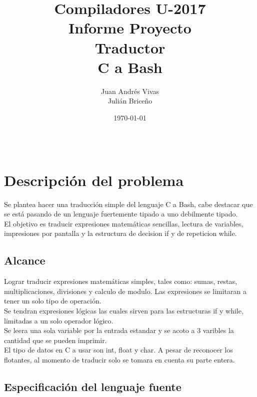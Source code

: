 \documentclass[aspectratio=169]{article}
\title{Compiladores U-2017 \\ Informe Proyecto \\ Traductor \\ C a Bash} %
\author{Juan Andr\'es Vivas\\
		Juli\'an Brice\~no} %
\date{\today} %
\begin{document}
\maketitle %

\begin{center}
\begin{tabular}{l r}

\end{tabular}
\end{center}

\newpage

\section{Descripci\'on del problema}

	Se plantea hacer una traducci\'on simple del lenguaje C a Bash, cabe destacar que se est\'a
	pasando de un lenguaje fuertemente tipado a uno debilmente tipado.\\

	El objetivo es traducir expresiones matem\'aticas sencillas, lectura de variables, impresiones
	por pantalla y la estructura de decision if y de repeticion while.

\subsection{Alcance}

	Lograr traducir expresiones matem\'aticas simples, tales como: sumas, restas, multiplicaciones,
	divisiones y calculo de modulo. Las expresiones se limitaran a tener un solo tipo de operaci\'on. \\

	Se tendran expresiones l\'ogicas las cuales sirven para las estructuras if y while, limitadas a un
	solo operador l\'ogico.\\

	Se leera una sola variable por la entrada estandar y se acoto a 3 varibles la cantidad que se pueden
	imprimir.\\

	El tipo de datos en C a usar son int, float y char. A pesar de reconocer los flotantes, al momento de traducir
	solo se tomara en cuenta su parte entera.

\subsection{Especificaci\'on del lenguaje fuente}
\end{document}
